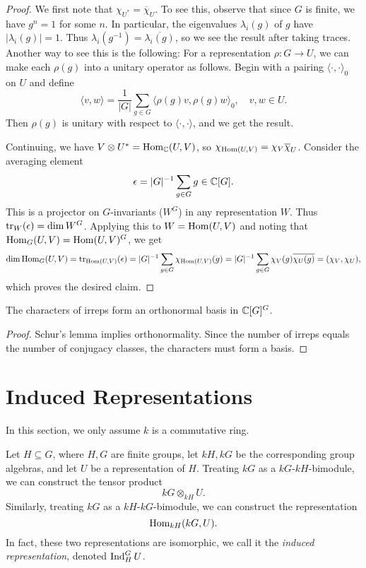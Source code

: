 \begin{proof}
  We first note that
  $\chi_{U^*} = \overline{\chi}_U$. To
  see this, observe that
  since $G$ is finite, we have
  $g^n = 1$ for some $n$. In particular,
  the eigenvalues $\lambda_i(g)$ of $g$
  have $|\lambda_i(g)| = 1$. Thus
  $\lambda_i(g^{-1}) = \overline{\lambda_i(g)}$, so we see the result after
  taking traces. Another
  way to see this is the following:
  For a representation $\rho : G \to U$,
  we can make each $\rho(g)$ into a unitary
  operator as follows. Begin with a
  pairing $\langle \cdot, \cdot \rangle_0$
  on $U$ and define
  \[
    \langle v, w \rangle
    = \frac{1}{|G|} \sum_{g \in G} \langle \rho(g) v, \rho(g) w \rangle_0, \quad
    v, w \in U.
  \]
  Then $\rho(g)$ is unitary with
  respect to $\langle \cdot, \cdot \rangle$,
  and we get the result.

  Continuing, we have
  $V \otimes U^* = \operatorname{Hom}_{\mathbb{C}}(U, V)$, so
  $\chi_{\operatorname{Hom}(U, V)} = \chi_V \overline{\chi}_U$.
  Consider the averaging element
  \[
    \epsilon = |G|^{-1} \sum_{g \in G} g \in \mathbb{C}[G].
  \]
  This is a projector on $G$-invariants
  ($W^G$) in any representation $W$. Thus
  $\operatorname{tr}_W(\epsilon) = \dim W^G$.
  Applying this to $W = \operatorname{Hom}(U, V)$ and noting
  that $\operatorname{Hom}_G(U, V) = \operatorname{Hom}(U, V)^G$, we
  get
  \[
    \dim \operatorname{Hom}_G(U, V)
    = \operatorname{tr}_{\operatorname{Hom}(U, V)}(\epsilon)
    = |G|^{-1} \sum_{g \in G} \chi_{\operatorname{Hom}(U, V)}(g)
    = |G|^{-1} \sum_{g \in G} \chi_V(g) \overline{\chi_U(g)}
    = (\chi_V, \chi_U),
  \]
  which proves the desired claim.
\end{proof}

\begin{corollary}
  The characters of irreps form an
  orthonormal basis in $\mathbb{C}[G]^G$.
\end{corollary}

\begin{proof}
  Schur's lemma implies orthonormality.
  Since the number of irreps equals the
  number of conjugacy classes, the
  characters must form a basis.
\end{proof}

\section{Induced Representations}

\begin{remark}
  In this
  section, we only assume $k$ is a
  commutative ring.

  Let $H \subseteq G$, where
  $H, G$ are finite groups, let
  $kH, kG$ be the
  corresponding group algebras, and let
  $U$ be a representation of $H$.
  Treating $kG$ as a $kG$-$kH$-bimodule,
  we can construct the tensor
  product
  \[
    kG \otimes_{kH} U.
  \]
  Similarly, treating $kG$ as a
  $kH$-$kG$-bimodule, we can construct
  the representation
  \[
    \operatorname{Hom}_{kH}(kG, U).
  \]
  In fact, these two representations are
  isomorphic, we call it the
  \emph{induced representation}, denoted
  $\operatorname{Ind}_H^G U$.
\end{remark}

